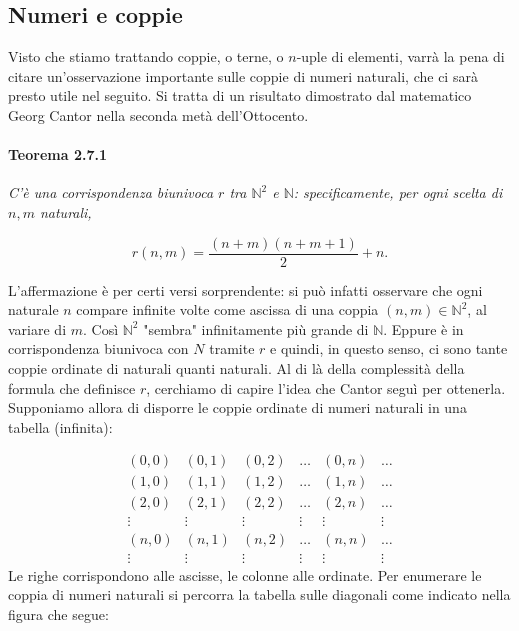 \subsection{Numeri e coppie}

Visto che stiamo trattando coppie, o terne, o $n$-uple di elementi, varrà la pena
di citare un'osservazione importante sulle coppie di numeri naturali, che ci sarà
presto utile nel seguito. Si tratta di un risultato dimostrato dal matematico
Georg Cantor nella seconda metà dell'Ottocento.

\paragraph{Teorema 2.7.1}
\textit{C'è una corrispondenza biunivoca $r$ tra ${\mathbb{N}}^2$ e $\mathbb{N}$:
    specificamente, per ogni scelta di $n,m$ naturali,}

\[
    r(n,m) = \frac{(n+m)(n+m+1)}{2} + n.
\]

L'affermazione è per certi versi sorprendente: si può infatti osservare che ogni
naturale $n$ compare infinite volte come ascissa di una coppia $(n, m) \in
    \mathbb{N}^2$, al variare di $m$. Così $\mathbb{N}^2$ "sembra" infinitamente più grande
di $\mathbb{N}$. Eppure è in corrispondenza biunivoca con $N$ tramite $r$ e quindi,
in questo senso, ci sono tante coppie ordinate di naturali quanti naturali. Al di là
della complessità della formula che definisce $r$, cerchiamo di capire l'idea che
Cantor seguì per ottenerla. Supponiamo allora di disporre le coppie ordinate di
numeri naturali in una tabella (infinita):

$$
    \begin{array}{cccccc}
        (0,0)  & (0,1)  &
        (0,2)  & \ldots & (0, n) & \ldots                   \\ (1,0) & (1,1) & (1,2) & \ldots & (1, n) & \ldots
        \\ (2,0) & (2,1) & (2,2) & \ldots & (2, n) & \ldots \\ \vdots & \vdots & \vdots &
        \vdots & \vdots & \vdots                            \\ (n, 0) & (n, 1) & (n, 2) & \ldots & (n, n) & \ldots \\
        \vdots & \vdots & \vdots & \vdots & \vdots & \vdots
    \end{array}
$$
Le righe
corrispondono alle ascisse, le colonne alle ordinate. Per enumerare le coppia di
numeri naturali si percorra la tabella sulle diagonali come indicato nella figura che
segue:

